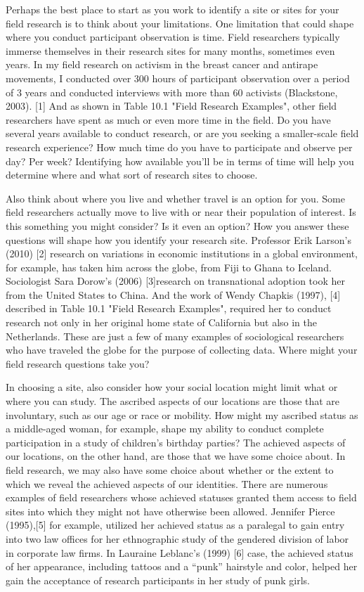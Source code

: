 Perhaps the best place to start as you work to identify a site or sites for your field research is to think about your limitations. One limitation that could shape where you conduct participant observation is time. Field researchers typically immerse themselves in their research sites for many months, sometimes even years. In my field research on activism in the breast cancer and antirape movements, I conducted over 300 hours of participant observation over a period of 3 years and conducted interviews with more than 60 activists (Blackstone, 2003). [1] And as shown in Table 10.1 "Field Research Examples", other field researchers have spent as much or even more time in the field. Do you have several years available to conduct research, or are you seeking a smaller-scale field research experience? How much time do you have to participate and observe per day? Per week? Identifying how available you’ll be in terms of time will help you determine where and what sort of research sites to choose.

Also think about where you live and whether travel is an option for you. Some field researchers actually move to live with or near their population of interest. Is this something you might consider? Is it even an option? How you answer these questions will shape how you identify your research site. Professor Erik Larson’s (2010) [2] research on variations in economic institutions in a global environment, for example, has taken him across the globe, from Fiji to Ghana to Iceland. Sociologist Sara Dorow’s (2006) [3]research on transnational adoption took her from the United States to China. And the work of Wendy Chapkis (1997), [4] described in Table 10.1 "Field Research Examples", required her to conduct research not only in her original home state of California but also in the Netherlands. These are just a few of many examples of sociological researchers who have traveled the globe for the purpose of collecting data. Where might your field research questions take you?

In choosing a site, also consider how your social location might limit what or where you can study. The ascribed aspects of our locations are those that are involuntary, such as our age or race or mobility. How might my ascribed status as a middle-aged woman, for example, shape my ability to conduct complete participation in a study of children’s birthday parties? The achieved aspects of our locations, on the other hand, are those that we have some choice about. In field research, we may also have some choice about whether or the extent to which we reveal the achieved aspects of our identities. There are numerous examples of field researchers whose achieved statuses granted them access to field sites into which they might not have otherwise been allowed. Jennifer Pierce (1995),[5] for example, utilized her achieved status as a paralegal to gain entry into two law offices for her ethnographic study of the gendered division of labor in corporate law firms. In Lauraine Leblanc’s (1999) [6] case, the achieved status of her appearance, including tattoos and a “punk” hairstyle and color, helped her gain the acceptance of research participants in her study of punk girls.

